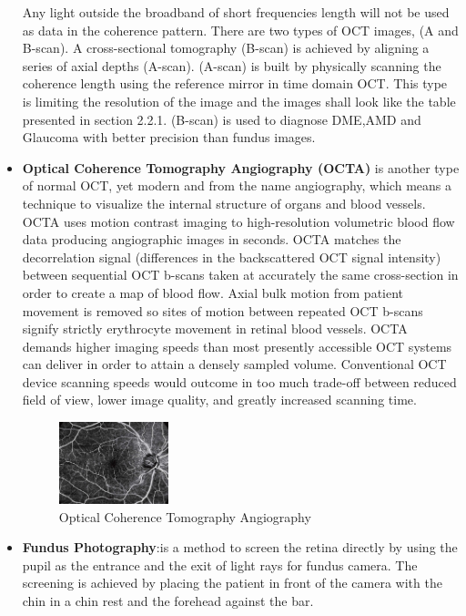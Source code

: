 \begin{itemize}
Any light outside the broadband of short frequencies length will not be used as data in the coherence pattern.
There are two types of OCT images, (A and B-scan).
A cross-sectional tomography (B-scan) is achieved by aligning a series of axial depths (A-scan).
(A-scan) is built by physically scanning the coherence length using the reference mirror in time domain OCT.
This type is limiting the resolution of the image and the images shall look like the table presented in section 2.2.1. 
(B-scan) is used to diagnose DME,AMD and Glaucoma with better precision than fundus images.    
\item \textbf{Optical Coherence Tomography Angiography (OCTA)} is another type of normal OCT, yet modern and from the name angiography, which means a technique to visualize the internal structure of organs and blood vessels.
OCTA uses motion contrast imaging to high-resolution volumetric blood flow data producing angiographic images in seconds.
OCTA matches the decorrelation signal (differences in the backscattered OCT signal intensity) between sequential OCT b-scans taken at accurately the same cross-section in order to create a map of blood flow.
Axial bulk motion from patient movement is removed so sites of motion between repeated OCT b-scans signify strictly erythrocyte movement in retinal blood vessels.
OCTA demands higher imaging speeds than most presently accessible OCT systems can deliver in order to attain a densely sampled volume.
Conventional OCT device scanning speeds would outcome in too much trade-off between reduced field of view, lower image quality, and greatly increased scanning time\cite{spaide2015retinal}.
\begin{figure}[htb]
        \centering
        \includegraphics[width=0.3\textwidth]{figures/OCTA.jpg} %
  \caption{Optical Coherence Tomography Angiography \cite{OCTA}}
  \label{fig:Glaucoma}
\end{figure}
\item \textbf{Fundus Photography}:is a method to screen the retina directly by using the pupil as the entrance and the exit of light rays for fundus camera.
The screening is achieved by placing the patient in front of the camera with the chin in a chin rest and the forehead against the bar.

\end{itemize}
